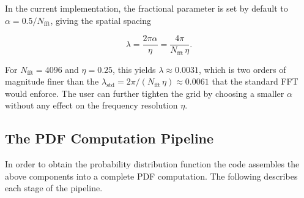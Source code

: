 In the current implementation, the fractional parameter is set by default to $\alpha = 0.5/N_\text{fft}$, giving the spatial spacing

\begin{equation}
    \lambda = \frac{2\pi\alpha}{\eta} = \frac{4\pi}{N_\text{fft}\,\eta}.
    \label{eq:lambda_frfft}
\end{equation}

For $N_\text{fft} = 4096$ and $\eta = 0.25$, this yields $\lambda \approx 0.0031$, which is two orders of magnitude finer than the $\lambda_{\text{std}} = 2\pi/(N_\text{fft}\,\eta) \approx 0.0061$ that the standard FFT would enforce. The user can further tighten the grid by choosing a smaller $\alpha$ without any effect on the frequency resolution $\eta$.

\subsection{The PDF Computation Pipeline}

In order to obtain the probability distribution function the code assembles the above components into a complete PDF computation. The following describes each stage of the pipeline.


